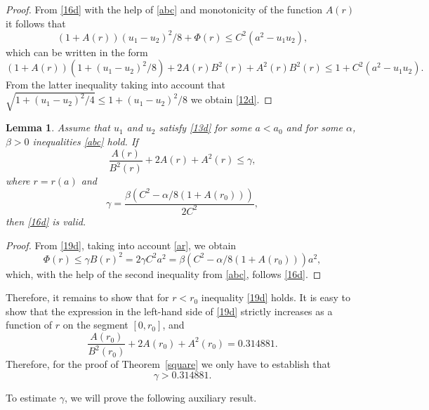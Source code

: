 \documentclass[12pt,a4paper]{amsart}
\newtheorem{lemma}{Lemma}
\begin{document}
\begin{proof} From \eqref{16d} with the help of \eqref{abc} and monotonicity of the function $A(r)$
it follows that
\begin{equation*}\label{15d}
(1+A(r))(u_1-u_2)^2/8+\Phi(r)\le C^2(a^2-u_1u_2),
\end{equation*}
which can be written in the form
\begin{equation*}
(1+A(r))(1+(u_1-u_2)^2/8)+2A(r)B^2(r)+A^2(r)B^2(r)\le 1+C^2(a^2-u_1u_2).
\end{equation*}
From the latter inequality taking into account that   $\sqrt{1+(u_1-u_2)^2/4}\le 1+(u_1-u_2)^2/8$ we obtain \eqref{12d}.
\end{proof}

\begin{lemma} \label{t10}
Assume that $u_1$ and $u_2$ satisfy \eqref{13d} for some $a<a_0$ and for some $\alpha$, $\beta>0$ inequalities \eqref{abc} hold.
If
\begin{equation}\label{19d}
\frac{A(r)}{B^2(r)}+2A(r)+A^2(r)\le \gamma,
\end{equation}
where $r=r(a)$ and
\begin{equation*}
\gamma=\frac{\beta(C^2-\alpha/8(1+A(r_0)))}{2C^2},
\end{equation*}
then  \eqref{16d} is valid.
\end{lemma}

\begin{proof}
From \eqref{19d}, taking into account \eqref{ar}, we obtain
\begin{equation*}
\Phi(r)\le\gamma B(r)^2=2\gamma C^2 a^2=\beta(C^2-\alpha/8(1+A(r_0)))a^2 ,
\end{equation*}
which, with the help of the second inequality from  \eqref{abc},
follows \eqref{16d}.
\end{proof}

Therefore, it remains to show that for $r<r_0$ inequality
\eqref{19d} holds. It is easy to show that the expression in the
left-hand side of \eqref{19d} strictly increases as a function of
$r$ on the segment $[0,r_0]$, and
\begin{equation*}
\frac{A(r_0)}{B^2(r_0)}+2A(r_0)+A^2(r_0)=
0.314881.
\end{equation*}
Therefore, for the proof of Theorem~\ref{square} we only have to establish that
\begin{equation}\label{20d}
\gamma>0.314881.
\end{equation}

To estimate $\gamma$, we will prove the following auxiliary result.
\end{document}
